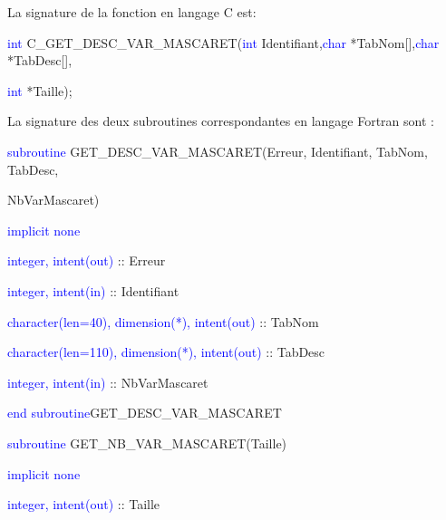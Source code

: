 \documentclass[a4paper,11pt]{article}
\begin{document}
 \vspace{0.5cm}
 
  La signature de la fonction en langage C est:
 
 \vspace{0.5cm}
 
 \textcolor{blue}{int} C\_GET\_DESC\_VAR\_MASCARET(\textcolor{blue}{int} Identifiant,\textcolor{blue}{char} *TabNom[],\textcolor{blue}{char} *TabDesc[],
 
  \textcolor{blue}{int} *Taille);
 
 \vspace{0.5cm} 
 
 La signature des deux subroutines correspondantes en langage Fortran sont :
 
 \vspace{0.5cm}
 
    \textcolor{blue}{subroutine} GET\_DESC\_VAR\_MASCARET(Erreur, Identifiant, TabNom, TabDesc,
    
     NbVarMascaret)
    
        \hspace{1cm}\textcolor{blue}{implicit none}                 
        
        \hspace{1cm} \textcolor{blue}{integer, intent(out)} :: Erreur
        
        \hspace{1cm} \textcolor{blue}{integer, intent(in)}  :: Identifiant
        
        \hspace{1cm} \textcolor{blue}{character(len=40), dimension(*), intent(out)}  :: TabNom
        
        \hspace{1cm} \textcolor{blue}{character(len=110), dimension(*), intent(out)}  :: TabDesc
        
        \hspace{1cm} \textcolor{blue}{integer, intent(in)}  :: NbVarMascaret
        
    \textcolor{blue}{end subroutine}GET\_DESC\_VAR\_MASCARET
    
    \textcolor{blue}{subroutine} GET\_NB\_VAR\_MASCARET(Taille)
    
        \hspace{1cm}\textcolor{blue}{implicit none}      
        
        \hspace{1cm} \textcolor{blue}{integer, intent(out)}  :: Taille
    
\end{document}
